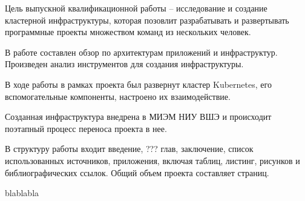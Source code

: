 \Abstract
Цель выпускной квалификационной работы -- исследование и создание кластерной инфраструктуры, которая позовлит разрабатывать и развертывать программные проекты множеством команд из нескольких человек.

В работе составлен обзор по архитектурам приложений и инфраструктур. Произведен анализ инструментов для создания инфраструктуры.

В ходе работы в рамках проекта был развернут кластер Kubernetes, его вспомогательные компоненты, настроено их взаимодействие.

Созданная инфраструктура внедрена в МИЭМ НИУ ВШЭ и происходит поэтапный процесс переноса проекта в нее.

В структуру работы входит введение, ??? глав, заключение, список использованных источников,  приложения, включая  таблиц,  листинг,  рисунков и  библиографических ссылок. Общий объем проекта составляет \pageref{LastPage} страниц.

\AbstractEn

blablabla
